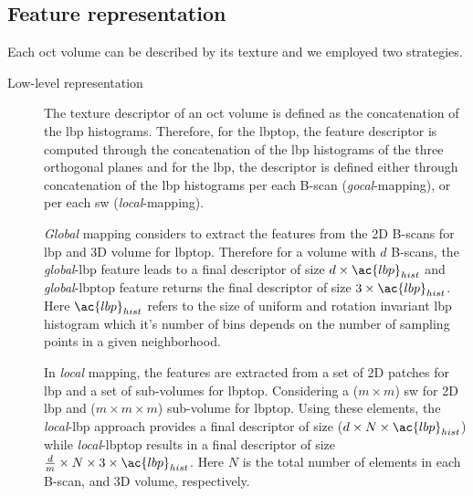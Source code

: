 \subsection{Feature representation}\label{subsec:fearep}

Each \ac{oct} volume can be described by its texture and we employed two strategies.

\begin{description}

\item[Low-level representation] The texture descriptor of an \ac{oct} volume is defined as the concatenation of the \ac{lbp} histograms.
Therefore, for the \ac{lbptop}, the feature descriptor is computed through the concatenation of the \ac{lbp} histograms of the three orthogonal planes and for the \ac{lbp}, the descriptor is defined either through concatenation of the \ac{lbp} histograms per each B-scan (\emph{gocal}-mapping), or per each \ac{sw} (\emph{local}-mapping).\\

{\color{red}\emph{Global} mapping considers to extract the features from the 2D B-scans for \ac{lbp} and 3D volume for \ac{lbptop}. 
Therefore for a volume with $d$ B-scans, the \emph{global}-\ac{lbp} feature leads to a final descriptor of size $d \times \ac{lbp}_{hist}$ and \emph{global}-\ac{lbptop} feature returns the final descriptor of size $3 \times \ac{lbp}_{hist}$.
Here $\ac{lbp}_{hist}$ refers to the size of uniform and rotation invariant \ac{lbp} histogram which it's number of bins depends on the number of sampling points in a given neighborhood. 

In \emph{local} mapping, the features are extracted from a set of 2D patches for \ac{lbp} and a set of sub-volumes for \ac{lbptop}.
Considering a ($m \times m$) \acf{sw} for 2D \ac{lbp} and ($ m \times m \times m$)  sub-volume for \ac{lbptop}. 
Using these elements, the \emph{local}-\ac{lbp} approach provides a final descriptor of size ($d \times N \times \ac{lbp}_{hist}$) while \emph{local}-\ac{lbptop} results in a final descriptor of size $\frac{d}{m} \times N \times 3 \times \ac{lbp}_{hist}$.
Here $N$ is the total number of elements in each B-scan, and 3D volume, respectively.\\}


\end{description}
